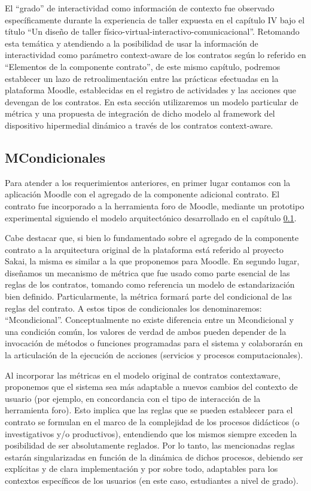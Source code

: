 {El “grado” de interactividad como información de contexto fue observado
específicamente durante la experiencia de taller expuesta en el capítulo IV
bajo el título “Un diseño de taller físico-virtual-interactivo-comunicacional”.
Retomando esta temática y atendiendo a la posibilidad de usar la información
de interactividad como parámetro context-aware de los contratos según lo referido
en “Elementos de la componente contrato”, de este mismo capítulo,
podremos establecer un lazo de retroalimentación entre las prácticas efectuadas
en la plataforma Moodle, establecidas en el registro de actividades y las
acciones que devengan de los contratos.
En esta sección utilizaremos un modelo particular de métrica y una propuesta
de integración de dicho modelo al framework del dispositivo hipermedial
dinámico a través de los contratos context-aware.



\subsection{MCondicionales}

Para atender a los requerimientos anteriores, en primer lugar contamos con la
aplicación Moodle con el agregado de la componente adicional contrato. El
contrato fue incorporado a la herramienta foro de Moodle, mediante un prototipo
experimental siguiendo el modelo arquitectónico desarrollado en el
capítulo \ref{}.

Cabe destacar que, si bien lo fundamentado sobre el agregado de la componente
contrato a la arquitectura original de la plataforma está referido al
proyecto Sakai, la misma es similar a la que proponemos para Moodle. En
segundo lugar, diseñamos un mecanismo de métrica que fue usado como parte
esencial de las reglas de los contratos, tomando como referencia un modelo de
estandarización bien definido. Particularmente, la métrica formará parte del
condicional de las reglas del contrato. A estos tipos de condicionales los denominaremos:
“Mcondicional”. Conceptualmente no existe diferencia entre un Mcondicional y una
condición común, los valores de verdad de ambos pueden depender de la invocación
de métodos o funciones programadas para el sistema y colaborarán en la
articulación de la ejecución de acciones (servicios y procesos computacionales).

Al incorporar las métricas en el modelo original de contratos contextaware,
proponemos que el sistema sea más adaptable a nuevos cambios del contexto de
usuario (por ejemplo, en concordancia con el tipo de interacción de la
herramienta foro). Esto implica que las reglas que se pueden establecer
para el contrato se formulan en el marco de la complejidad de los procesos
didácticos (o investigativos y/o productivos), entendiendo que los mismos
siempre exceden la posibilidad de ser absolutamente reglados. Por lo tanto, las
mencionadas reglas estarán singularizadas en función de la dinámica de dichos
procesos, debiendo ser explícitas y de clara implementación y por sobre todo,
adaptables para los contextos específicos de los usuarios (en este caso, estudiantes
a nivel de grado).

}
